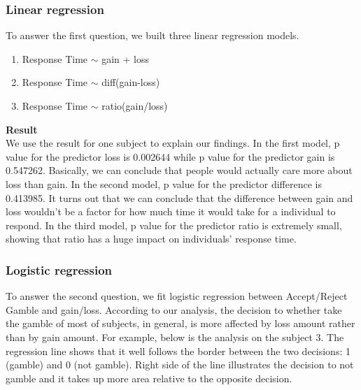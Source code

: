 \subsubsection {Linear regression}
To answer the first question, we built three linear regression models.
\begin{enumerate}
\item  Response Time $\sim$ gain + loss
\item  Response Time $\sim$ diff(gain-loss)
\item  Response Time $\sim$ ratio(gain/loss)
\end {enumerate}
\textbf{Result} \\
We use the result for one subject to explain our findings. In the first model, 
p value for the predictor loss is 0.002644 while p value for the predictor gain 
is 0.547262. Basically, we can conclude that people would actually care more 
about loss than gain. In the second model, p value for the predictor difference
is 0.413985.  It turns out that we can conclude that the difference between gain 
and loss wouldn't be a factor for how much time it would take for a individual 
to respond. In the third model, p value for the predictor ratio is extremely 
small, showing that ratio has a huge impact on individuals' response time.

\subsubsection {Logistic regression}
\noindent
To answer the second question, we fit logistic regression between Accept/Reject
Gamble and gain/loss. According to our analysis, the decision to whether take 
the gamble of most of subjects, in general, is more affected by loss amount 
rather than by gain amount.  For example, below is the analysis on the subject 
3. The regression line shows that it well follows the border between the two 
decisions: 1 (gamble) and 0 (not gamble). Right side of the line illustrates 
the decision to not gamble and it takes up more area relative to the opposite 
decision.
